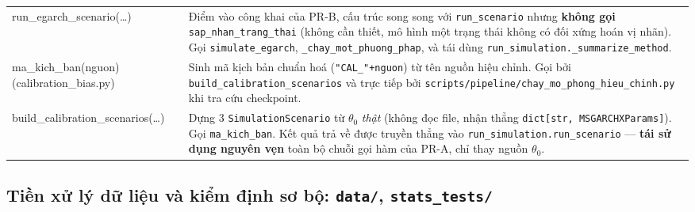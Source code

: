 \documentclass[11pt,a4paper]{article}
\newcommand{\code}[1]{\texttt{#1}}
\newcommand{\file}[1]{\texttt{#1}}
\begin{document}
\begin{longtable}{@{}>{\ttfamily\scriptsize\raggedright\arraybackslash}p{5.0cm} >{\raggedright\arraybackslash}p{9.5cm}@{}}
run\_egarch\_scenario(\ldots) & Điểm vào công khai của PR-B, cấu trúc song song với \code{run\_scenario} nhưng \textbf{không gọi} \code{sap\_nhan\_trang\_thai} (không cần thiết, mô hình một trạng thái không có đối xứng hoán vị nhãn). Gọi \code{simulate\_egarch}, \code{\_chay\_mot\_phuong\_phap}, và tái dùng \code{run\_simulation.\_summarize\_method}. \\
ma\_kich\_ban(nguon) \newline \footnotesize{(calibration\_bias.py)} & Sinh mã kịch bản chuẩn hoá (\code{"CAL\_"+nguon}) từ tên nguồn hiệu chỉnh. Gọi bởi \code{build\_calibration\_scenarios} và trực tiếp bởi \code{scripts/pipeline/chay\_mo\_phong\_hieu\_chinh.py} khi tra cứu checkpoint. \\
build\_calibration\_scenarios(\ldots) & Dựng 3 \code{SimulationScenario} từ $\theta_0$ \emph{thật} (không đọc file, nhận thẳng \code{dict[str, MSGARCHXParams]}). Gọi \code{ma\_kich\_ban}. Kết quả trả về được truyền thẳng vào \code{run\_simulation.run\_scenario} --- \textbf{tái sử dụng nguyên vẹn} toàn bộ chuỗi gọi hàm của PR-A, chỉ thay nguồn $\theta_0$. \\
\end{longtable}

\subsection{Tiền xử lý dữ liệu và kiểm định sơ bộ: \file{data/}, \file{stats\_tests/}}
\end{document}
